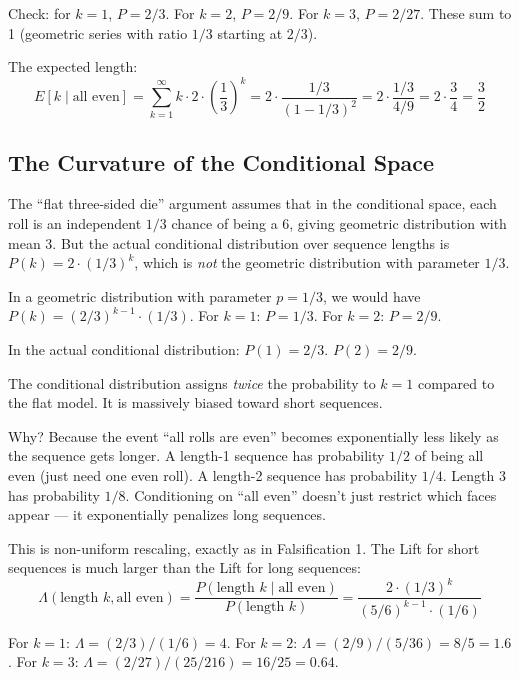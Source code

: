 \documentclass[12pt]{article}
\begin{document}
Check: for $k = 1$, $P = 2/3$. For $k = 2$, $P = 2/9$. For $k = 3$, $P = 2/27$. These sum to 1 (geometric series with ratio $1/3$ starting at $2/3$).

The expected length:
\begin{equation}
E[k \mid \text{all even}] = \sum_{k=1}^{\infty} k \cdot 2 \cdot \left(\frac{1}{3}\right)^k = 2 \cdot \frac{1/3}{(1-1/3)^2} = 2 \cdot \frac{1/3}{4/9} = 2 \cdot \frac{3}{4} = \frac{3}{2}
\end{equation}

\subsection{The Curvature of the Conditional Space}

The ``flat three-sided die'' argument assumes that in the conditional space, each roll is an independent $1/3$ chance of being a 6, giving geometric distribution with mean 3. But the actual conditional distribution over sequence lengths is $P(k) = 2 \cdot (1/3)^k$, which is \textit{not} the geometric distribution with parameter $1/3$.

In a geometric distribution with parameter $p = 1/3$, we would have $P(k) = (2/3)^{k-1} \cdot (1/3)$. For $k=1$: $P = 1/3$. For $k=2$: $P = 2/9$.

In the actual conditional distribution: $P(1) = 2/3$. $P(2) = 2/9$.

The conditional distribution assigns \textit{twice} the probability to $k=1$ compared to the flat model. It is massively biased toward short sequences.

Why? Because the event ``all rolls are even'' becomes exponentially less likely as the sequence gets longer. A length-1 sequence has probability $1/2$ of being all even (just need one even roll). A length-2 sequence has probability $1/4$. Length 3 has probability $1/8$. Conditioning on ``all even'' doesn't just restrict which faces appear --- it exponentially penalizes long sequences.

This is non-uniform rescaling, exactly as in Falsification 1. The Lift for short sequences is much larger than the Lift for long sequences:
\begin{equation}
\Lambda(\text{length } k, \text{all even}) = \frac{P(\text{length } k \mid \text{all even})}{P(\text{length } k)} = \frac{2 \cdot (1/3)^k}{(5/6)^{k-1} \cdot (1/6)}
\end{equation}

For $k=1$: $\Lambda = (2/3) / (1/6) = 4$. For $k=2$: $\Lambda = (2/9) / (5/36) = 8/5 = 1.6$. For $k=3$: $\Lambda = (2/27) / (25/216) = 16/25 = 0.64$.
\end{document}
